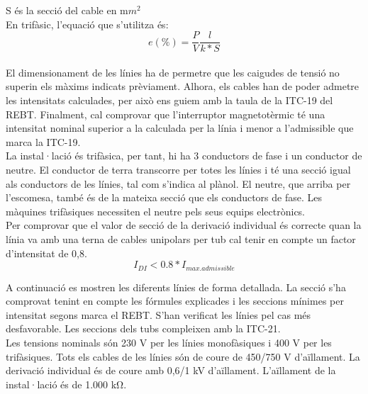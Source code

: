 S és la secció del cable en m$m^2$\\
\newline
En trifàsic, l'equació que s'utilitza és:
\begin{equation}
e(\%)=\frac{P}{V}\frac{l}{k*S}
\end{equation}
\\
El dimensionament de les línies ha de permetre que les caigudes de tensió no superin els màxims indicats prèviament. Alhora, els cables han de poder admetre les intensitats calculades, per això ens guiem amb la taula de la ITC-19 del REBT. Finalment, cal comprovar que  l'interruptor magnetotèrmic té una intensitat nominal superior a la calculada per la línia i menor a l'admissible que marca la ITC-19.\\
\newline La instal·lació és trifàsica, per tant, hi ha 3 conductors de fase i un conductor de neutre. El conductor de terra transcorre per totes les línies i té una secció igual als conductors de les línies, tal com s'indica al plànol. El neutre, que arriba per l'escomesa, també és de la mateixa secció que els conductors de fase. Les màquines trifàsiques necessiten el neutre pels seus equips electrònics.\\
\newline
Per comprovar que el valor de secció de la derivació individual és correcte quan la línia va amb una terna de cables unipolars per tub cal tenir en compte un factor d'intensitat de 0,8.
\begin{equation}
I_{DI} < 0.8 * I_{max. admissible}
\end{equation}

\noindent A continuació es mostren les diferents línies de forma detallada. La secció s'ha comprovat tenint en compte les fórmules explicades i les seccions mínimes per intensitat segons marca el REBT. S'han verificat les línies pel cas més desfavorable. Les seccions dels tubs compleixen amb la ITC-21.\\
\newline Les tensions nominals són 230 V per les línies monofàsiques i 400 V per les trifàsiques. Tots els cables de les línies són de coure de 450/750 V d'aïllament. La derivació individual és de coure amb 0,6/1 kV d'aïllament. L'aïllament de la instal·lació és de 1.000 k$\si{\ohm}$.

